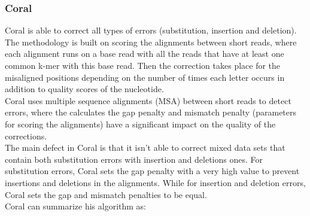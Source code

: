 \documentclass{llncs}
\begin{document}
\subsubsection{Coral}
Coral \cite{Coral} is able to correct all types of errors (substitution, insertion and deletion). The methodology is built on scoring the alignments between short reads, where each alignment runs on a base read with all the reads that have at least one common k-mer with this base read. Then the correction takes place for the misaligned positions depending on the number of times each letter occurs in addition to quality scores of the nucleotide.
\\
Coral uses multiple sequence alignments (MSA) between short reads to detect errors, where the calculates the gap penalty and mismatch penalty (parameters for scoring the alignments) have a significant impact on the quality of the corrections. 
\\
The main defect in Coral is that it isn't able to correct mixed data sets that contain both substitution errors with insertion and deletions ones.
For substitution errors, Coral sets the gap penalty with a very high value to prevent insertions and deletions in the alignments. While for insertion and deletion errors, Coral sets the gap and mismatch penalties to be equal.
\\
Coral can summarize his algorithm as:
\end{document}
